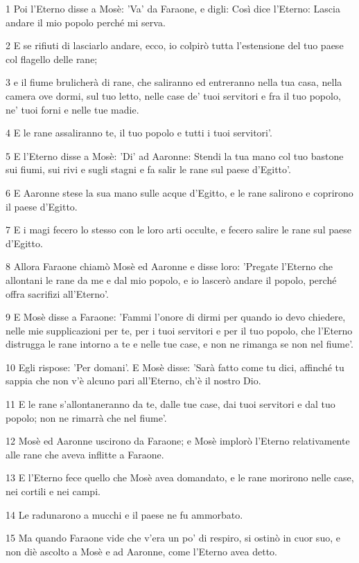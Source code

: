 \par 1 Poi l'Eterno disse a Mosè: 'Va' da Faraone, e digli: Così dice l'Eterno: Lascia andare il mio popolo perché mi serva.
\par 2 E se rifiuti di lasciarlo andare, ecco, io colpirò tutta l'estensione del tuo paese col flagello delle rane;
\par 3 e il fiume brulicherà di rane, che saliranno ed entreranno nella tua casa, nella camera ove dormi, sul tuo letto, nelle case de' tuoi servitori e fra il tuo popolo, ne' tuoi forni e nelle tue madie.
\par 4 E le rane assaliranno te, il tuo popolo e tutti i tuoi servitori'.
\par 5 E l'Eterno disse a Mosè: 'Di' ad Aaronne: Stendi la tua mano col tuo bastone sui fiumi, sui rivi e sugli stagni e fa salir le rane sul paese d'Egitto'.
\par 6 E Aaronne stese la sua mano sulle acque d'Egitto, e le rane salirono e coprirono il paese d'Egitto.
\par 7 E i magi fecero lo stesso con le loro arti occulte, e fecero salire le rane sul paese d'Egitto.
\par 8 Allora Faraone chiamò Mosè ed Aaronne e disse loro: 'Pregate l'Eterno che allontani le rane da me e dal mio popolo, e io lascerò andare il popolo, perché offra sacrifizi all'Eterno'.
\par 9 E Mosè disse a Faraone: 'Fammi l'onore di dirmi per quando io devo chiedere, nelle mie supplicazioni per te, per i tuoi servitori e per il tuo popolo, che l'Eterno distrugga le rane intorno a te e nelle tue case, e non ne rimanga se non nel fiume'.
\par 10 Egli rispose: 'Per domani'. E Mosè disse: 'Sarà fatto come tu dici, affinché tu sappia che non v'è alcuno pari all'Eterno, ch'è il nostro Dio.
\par 11 E le rane s'allontaneranno da te, dalle tue case, dai tuoi servitori e dal tuo popolo; non ne rimarrà che nel fiume'.
\par 12 Mosè ed Aaronne uscirono da Faraone; e Mosè implorò l'Eterno relativamente alle rane che aveva inflitte a Faraone.
\par 13 E l'Eterno fece quello che Mosè avea domandato, e le rane morirono nelle case, nei cortili e nei campi.
\par 14 Le radunarono a mucchi e il paese ne fu ammorbato.
\par 15 Ma quando Faraone vide che v'era un po' di respiro, si ostinò in cuor suo, e non diè ascolto a Mosè e ad Aaronne, come l'Eterno avea detto.
